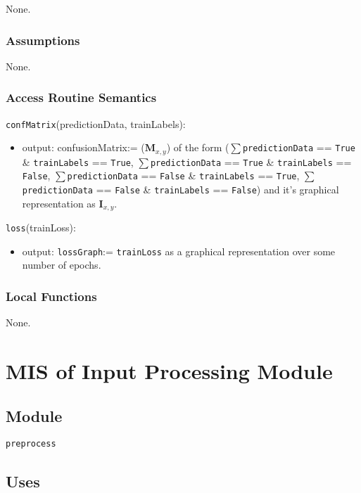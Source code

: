 \documentclass[12pt, titlepage]{article}
\def\code#1{\texttt{#1}}
\begin{document}
None.

\subsubsection{Assumptions}

None.

\subsubsection{Access Routine Semantics}

\noindent \code{confMatrix}(predictionData, trainLabels):
\begin{itemize} 
\item output: confusionMatrix:= ($\mathbf{M}_{x,y}$) of the form 
($\sum$\code{predictionData} == \code{True} \& \code{trainLabels} == \code{True}, $\sum$\code{predictionData} == \code{True} \& \code{trainLabels} == \code{False}, $\sum$\code{predictionData} == \code{False} \& \code{trainLabels} == \code{True}, $\sum$\code{predictionData} == \code{False} \& \code{trainLabels} == \code{False})
and it's graphical representation as $\mathbf{I}_{x,y}$.
\end{itemize}

\noindent \code{loss}(trainLoss):
\begin{itemize} 
\item output: \code{lossGraph}:= \code{trainLoss} as a graphical representation over some number of epochs.
\end{itemize}

\subsubsection{Local Functions}

None.

\section{MIS of Input Processing Module} \label{ModuleIP} 

\subsection{Module}

\code{preprocess}

\subsection{Uses}
\end{document}
